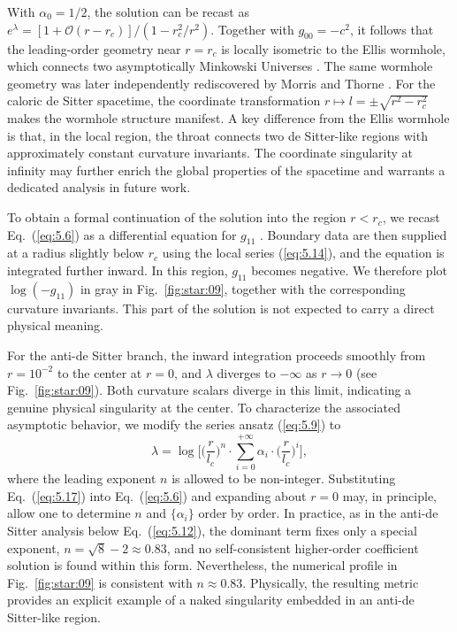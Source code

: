 \documentclass[aps,prd,twocolumn]{revtex4-2}
\begin{document}
With $\alpha_0=1/2$, the solution can be recast as $e^\lambda=[1+\mathcal{O}(r-r_c)]/(1-r_c^2/r^2)$. Together with $g_{00}=-c^2$, it follows that the leading-order geometry near $r=r_c$ is locally isometric to the Ellis wormhole, which connects two asymptotically Minkowski Universes \cite{Ellis1973.JMathPhysNY.14.104,*Ellis1974}. The same wormhole geometry was later independently rediscovered by Morris and Thorne \cite{Morris1988.AmJPhys.56.395,James2015}. For the caloric de Sitter spacetime, the coordinate transformation $r\mapsto l=\pm\sqrt{r^2-r_c^2}$ \cite{Morris1988.AmJPhys.56.395} makes the wormhole structure manifest. A key difference from the Ellis wormhole is that, in the local region, the throat connects two de Sitter-like regions with approximately constant curvature invariants. The coordinate singularity at infinity may further enrich the global properties of the spacetime and warrants a dedicated analysis in future work.

To obtain a formal continuation of the solution into the region $r<r_c$, we recast Eq.~(\ref{eq:5.6}) as a differential equation for $g_{11}$ \cite{NotShown}. Boundary data are then supplied at a radius slightly below $r_c$ using the local series (\ref{eq:5.14}), and the equation is integrated further inward. In this region, $g_{11}$ becomes negative. We therefore plot $\log(-g_{11})$ in gray in Fig.~\ref{fig:star:09}, together with the corresponding curvature invariants. This part of the solution is not expected to carry a direct physical meaning.

For the anti-de Sitter branch, the inward integration proceeds smoothly from $r=10^{-2}$ to the center at $r=0$, and $\lambda$ diverges to $-\infty$ as $r\rightarrow0$ (see Fig.~\ref{fig:star:09}). Both curvature scalars diverge in this limit, indicating a genuine physical singularity at the center. To characterize the associated asymptotic behavior, we modify the series ansatz (\ref{eq:5.9}) to
\begin{equation}\label{eq:5.17}
  \lambda = \log \bigg[ \Big(\frac{r}{l_c}\Big)^{n}\cdot\sum_{i=0}^{+\infty} \alpha_i\cdot\Big(\frac{r}{l_c}\Big)^{i} \bigg],
\end{equation}
where the leading exponent $n$ is allowed to be non-integer. Substituting Eq.~(\ref{eq:5.17}) into Eq.~(\ref{eq:5.6}) and expanding about $r=0$ may, in principle, allow one to determine $n$ and $\{\alpha_i\}$ order by order. In practice, as in the anti-de Sitter analysis below Eq.~(\ref{eq:5.12}), the dominant term fixes only a special exponent, $n=\sqrt{8}-2\approx0.83$, and no self-consistent higher-order coefficient solution is found within this form. Nevertheless, the numerical profile in Fig.~\ref{fig:star:09} is consistent with $n\approx0.83$. Physically, the resulting metric provides an explicit example of a naked singularity \cite{Penrose1969.NotEngJ.1.252} embedded in an anti-de Sitter-like region.
\end{document}

